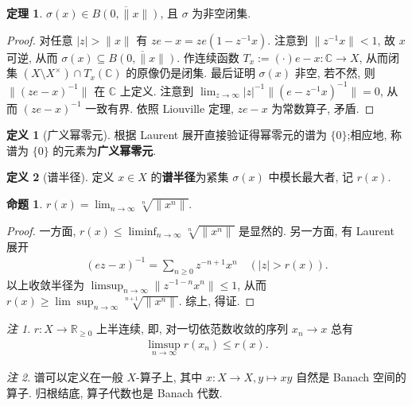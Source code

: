 \documentclass{MainStyle}
\theoremstyle{definition}
\theoremstyle{definition}
\theoremstyle{definition}
\newtheorem{definition}{定义}
\theoremstyle{definition}
\newtheorem{proposition}{命题}
\theoremstyle{definition}
\theoremstyle{definition}
\theoremstyle{definition}
\newtheorem{theorem}{定理}
\theoremstyle{remark}
\newtheorem{remark}{注}
\theoremstyle{remark}
\begin{document}
\begin{theorem}
    $\sigma(x)\in \overline{B(0,\|x\|)}$, 且 $\sigma$ 为非空闭集.
    \begin{proof}
        对任意 $|z|>\|x\|$ 有 $ze-x=ze(1-z^{-1}x)$. 注意到 $\|z^{-1}x\|<1$, 故 $x$ 可逆, 从而 $\sigma(x)\subseteq \overline{B(0,\|x\|)}$. 作连续函数 $T_x:=(\cdot)e-x:\mathbb C\to X$, 从而闭集 $(X\setminus X^\times)\cap T_x(\mathbb C)$ 的原像仍是闭集. 最后证明 $\sigma(x)$ 非空, 若不然, 则 $\|(ze-x)^{-1}\|$ 在 $\mathbb C$ 上定义. 注意到 $\lim_{z\to \infty}|z|^{-1}\|(e-z^{-1}x)^{-1}\|=0$, 从而 $(ze-x)^{-1}$ 一致有界. 依照 Liouville 定理, $ze-x$ 为常数算子, 矛盾.
    \end{proof}
\end{theorem}

\begin{definition}[广义幂零元]
    根据 Laurent 展开直接验证得幂零元的谱为 $\{0\}$;相应地, 称谱为 $\{0\}$ 的元素为\textbf{广义幂零元}.
\end{definition}

\begin{definition}[谱半径]
    定义 $x\in X$ 的\textbf{谱半径}为紧集 $\sigma(x)$ 中模长最大者, 记 $r(x)$.
\end{definition}

\begin{proposition}
    $r(x)=\lim_{n\to\infty}\sqrt[n]{\|x^n\|}$.
    \begin{proof}
        一方面, $r(x)\leq \liminf_{n\to\infty}\sqrt[n]{\|x^n\|}$ 是显然的. 另一方面, 有 Laurent 展开
        \begin{align*}
            (ez-x)^{-1}=\sum_{n\geq 0} z^{-{n+1}}x^n\quad (|z|>r(x)).
        \end{align*}
        以上收敛半径为 $\limsup_{n\to\infty}\|z^{-1-n}x^n\|\leq 1$, 从而 $r(x)\geq \lim\sup_{n\to\infty}\sqrt[n+1]{\|x^n\|}$. 综上, 得证.
    \end{proof}
\end{proposition}

\begin{remark}
    $r:X\to \mathbb R_{\geq 0}$ 上半连续, 即, 对一切依范数收敛的序列 $x_n\to x$ 总有
    \begin{align*}
        \limsup_{n\to\infty} r(x_n)\leq r(x).
    \end{align*}
\end{remark}

\begin{remark}
    谱可以定义在一般 $X$-算子上, 其中 $x:X\to X, y\mapsto xy$ 自然是 Banach 空间的算子. 归根结底, 算子代数也是 Banach 代数.
\end{remark}
\end{document}
